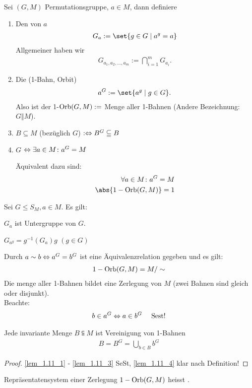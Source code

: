 \begin{definition}
	Sei $(G,M)$ Permutationsgruppe, $a\in M$, dann definiere
	\begin{enumerate}
		\item Den  von $a$
		\begin{align*}
			G_a := \set{g \in G \mid a^g = a}
		\end{align*}
		Allgemeiner haben wir 
		\begin{align*}
			G_{a_1, a_2, \dots, a_m} := \bigcap_{i=1}^m G_{a_i}.
		\end{align*}\label{sec1:exm:Orbit}
		\item Die  (1-Bahn, Orbit)
		\begin{align*}
			a^G := \set{a^g \mid g \in G}.
		\end{align*}
		Also ist der 1-$\operatorname{Orb}(G,M):=$ Menge aller 1-Bahnen (Andere Bezeichnung: $G\Vert M$).
		\item $B \subseteq M$  (bezüglich $G$) $:\Leftrightarrow B^G \subseteqq B$ 
		\item $G$  $\Leftrightarrow \exists a \in M \colon a^G = M$
		\begin{*remark}
			Äquivalent dazu sind:
			\begin{align*}
				\forall a \in M \colon a^G = M\\
				\abs{1-\Orb(G,M)} = 1
			\end{align*}
		\end{*remark}
	\end{enumerate}
\end{definition}
\begin{lemma}
	Sei $G \le S_M, a \in M$. Es gilt:
	\begin{lemmaenum}
		\item $G_a$ ist Untergruppe von $G$. \label{lem_1.11_1}
		\item $G_{a^g} = g^{-1}(G_a)g$ $(g \in G)$ \label{lem_1.11_2}
		\item Durch $a \sim b \Leftrightarrow a^G = b^G$ ist eine Äquivalenzrelation gegeben und es gilt:
		\begin{align*}
			1-\operatorname{Orb}(G,M) = M/\sim
		\end{align*}
		Die menge aller 1-Bahnen bildet eine Zerlegung von $M$ (zwei Bahnen sind gleich oder disjunkt).\\
		Beachte:
		\begin{align*}
			b \in a^G \Leftrightarrow a \in b^G \quad \text{ Sest!}
		\end{align*}
		\label{lem_1.11_3}
		\item Jede invariante Menge $B \subseteqq M$ ist Vereinigung von 1-Bahnen
		\begin{align*}
			B = B^G = \bigcup_{b \in B} b^G
		\end{align*}
		\label{lem_1.11_4}
	\end{lemmaenum}
\end{lemma}
\begin{proof}
	\cref{lem_1.11_1} - \cref{lem_1.11_3} SeSt, \cref{lem_1.11_4} klar nach Definition!
\end{proof}
\begin{remark}
	Repräsentatensystem einer Zerlegung $1-\operatorname{Orb}(G,M)$ heisst .
\end{remark}
